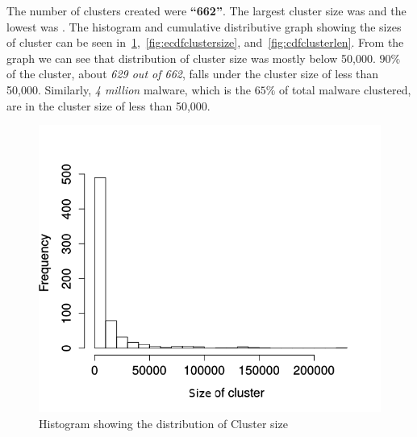 The number of clusters created were \textbf{``662''}.
The largest cluster size was {\getlargestclustersize{}} and the lowest was {\getlowestclustersize{}}.
The histogram and cumulative distributive graph showing the sizes of cluster can be seen in~\ref{fig:histclustersize},~\ref{fig:ecdfclustersize}, and~\ref{fig:cdfclusterlen}.
From the graph we can see that distribution of cluster size was mostly below 50,000.
$90\%$ of the cluster, about \emph{629 out of 662}, falls under the cluster size of less than 50,000.
Similarly, \emph{4 million} malware, which is the $65\%$ of total malware clustered, are in the cluster size of less than 50,000.\\

\begin{figure}[htbp]
\begin{center}
  \includegraphics[scale=0.5]{figures/histclustersize_new.png}
\end{center}
\caption{Histogram showing the distribution of Cluster size}
\label{fig:histclustersize}
\end{figure}

